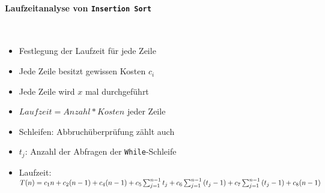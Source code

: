 \documentclass[
    ngerman,
    color=3b,
    dark_mode,
    load_common, %
    summary,
    boxarc,
]{tuda_summary}
\begin{document}
\paragraph{Laufzeitanalyse von \texttt{Insertion Sort}} {\label{insSortLaufzeit}}\mbox{}
\vspace*{1em}\\
\begin{minipage}[c]{0.3\textwidth}
    \mbox{}
    \centering
    \resetrc
    \label{tab:insertion-sort:laufzeit}
\end{minipage}
\begin{minipage}[c]{0.6\textwidth}
    \begin{itemize}
        \item Festlegung der Laufzeit für jede Zeile
        \item Jede Zeile besitzt gewissen Kosten \texttt{$c_i$}
        \item Jede Zeile wird $x$ mal durchgeführt
        \item $Laufzeit = Anzahl * Kosten$ jeder Zeile
        \item Schleifen: Abbruchüberprüfung zählt auch
        \item \texttt{$t_j$}: Anzahl der Abfragen der \texttt{While}-Schleife
        \item Laufzeit:
              $T(n)=c_{1} n+c_{2}(n-1)+c_{4}(n-1)+c_{5} \sum_{j=1}^{n-1} t_{j}\linebreak +c_{6} \sum_{j=1}^{n-1}\left(t_{j}-1\right)+c_{7} \sum_{j=1}^{n-1}\left(t_{j}-1\right)+c_{8}(n-1)$
    \end{itemize}
\end{minipage}
\end{document}
